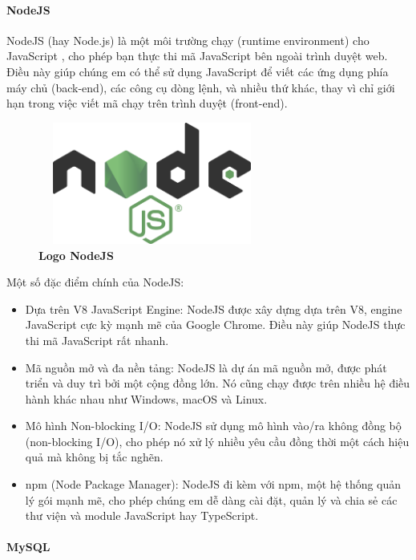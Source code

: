 \paragraph{NodeJS}
\mbox{}

NodeJS (hay Node.js) là một môi trường chạy (runtime environment) cho JavaScript \cite{nodejs}, cho phép bạn thực thi mã JavaScript bên ngoài trình duyệt web. Điều này giúp chúng em có thể sử dụng JavaScript để viết các ứng dụng phía máy chủ (back-end), các công cụ dòng lệnh, và nhiều thứ khác, thay vì chỉ giới hạn trong việc viết mã chạy trên trình duyệt (front-end).

\begin{figure}[H]
	\centering
	\includegraphics[width=7.5cm,height=4cm]{Images/Technology/nodejs.png}
	\caption[Logo NodeJS]{\bfseries \fontsize{12pt}{0pt}
		\selectfont Logo NodeJS}
	\label{nodejs} %
\end{figure}

Một số đặc điểm chính của NodeJS:
\begin{itemize}
	\item Dựa trên V8 JavaScript Engine: NodeJS được xây dựng dựa trên V8, engine JavaScript cực kỳ mạnh mẽ của Google Chrome. Điều này giúp NodeJS thực thi mã JavaScript rất nhanh.
	\item Mã nguồn mở và đa nền tảng: NodeJS là dự án mã nguồn mở, được phát triển và duy trì bởi một cộng đồng lớn. Nó cũng chạy được trên nhiều hệ điều hành khác nhau như Windows, macOS và Linux.
	\item Mô hình Non-blocking I/O: NodeJS sử dụng mô hình vào/ra không đồng bộ (non-blocking I/O), cho phép nó xử lý nhiều yêu cầu đồng thời một cách hiệu quả mà không bị tắc nghẽn.
	\item npm (Node Package Manager): NodeJS đi kèm với npm, một hệ thống quản lý gói mạnh mẽ, cho phép chúng em dễ dàng cài đặt, quản lý và chia sẻ các thư viện và module JavaScript hay TypeScript.
\end{itemize}

\paragraph{MySQL}
\mbox{}

